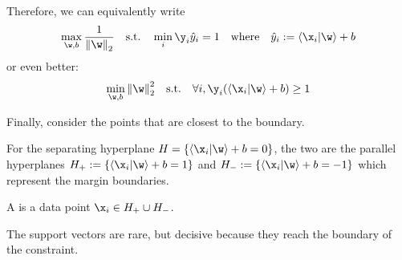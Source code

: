 \documentclass[class=cs480,notes,tikz]{agony}
\begin{document}
Therefore, we can equivalently write
\[ \max_{\w,b} \frac{1}{\norm{\w}_2} \qq{s.t.} \min_i \y_i \hat y_i = 1 \qq{where} \hat y_i := \ip{\x_i}{\w} + b \]
or even better:
\[ \min_{\w,b} \norm{\w}_2^2 \qq{s.t.} \forall i,\y_i(\ip{\x_i}{\w} + b) \geq 1 \]

Finally, consider the points that are closest to the boundary.
\begin{defn*}
  For the separating hyperplane $H = \{\ip{\x_i}{\w}+b = 0\}$,
  the two  are the parallel hyperplanes
  $H_+ := \{\ip{\x_i}{\w}+b = 1\}$ and $H_- := \{\ip{\x_i}{\w}+b = -1\}$
  which represent the margin boundaries.

  A  is a data point $\x_i \in H_+ \cup H_-$.
\end{defn*}
The support vectors are rare, but decisive because they reach the boundary of the constraint.
\end{document}

